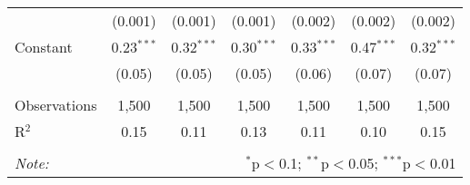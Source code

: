 \documentclass[
]{article}
\begin{document}
\begin{sidewaystable}[!htbp]
\begin{tabular}{@{\extracolsep{1pt}}lcccccc}
  & (0.001) & (0.001) & (0.001) & (0.002) & (0.002) & (0.002) \\ 
  Constant & 0.23$^{***}$ & 0.32$^{***}$ & 0.30$^{***}$ & 0.33$^{***}$ & 0.47$^{***}$ & 0.32$^{***}$ \\ 
  & (0.05) & (0.05) & (0.05) & (0.06) & (0.07) & (0.07) \\ 
 \hline \\[-1.8ex] 
Observations & 1,500 & 1,500 & 1,500 & 1,500 & 1,500 & 1,500 \\ 
R$^{2}$ & 0.15 & 0.11 & 0.13 & 0.11 & 0.10 & 0.15 \\ 
\hline 
\hline \\[-1.8ex] 
\textit{Note:}  & \multicolumn{6}{r}{$^{*}$p$<$0.1; $^{**}$p$<$0.05; $^{***}$p$<$0.01} \\ 
\end{tabular} 
\end{sidewaystable}
\end{document}

